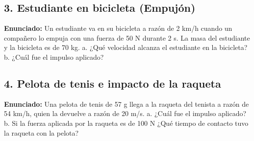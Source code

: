 \documentclass[12pt, letterpaper]{article}
\begin{document}
	
	\subsection*{3. Estudiante en bicicleta (Empujón)}
	\noindent \textbf{Enunciado:} Un estudiante va en su bicicleta a razón de 2 km/h cuando un compañero lo empuja con una fuerza de 50 N durante 2 s. La masa del estudiante y la bicicleta es de 70 kg. a. ¿Qué velocidad alcanza el estudiante en la bicicleta? b. ¿Cuál fue el impulso aplicado?
	
	
	\subsection*{4. Pelota de tenis e impacto de la raqueta}
	\noindent \textbf{Enunciado:} Una pelota de tenis de 57 g llega a la raqueta del tenista a razón de 54 km/h, quien la devuelve a razón de 20 m/s. a. ¿Cuál fue el impulso aplicado? b. Si la fuerza aplicada por la raqueta es de 100 N ¿Qué tiempo de contacto tuvo la raqueta con la pelota?
	
\end{document}
